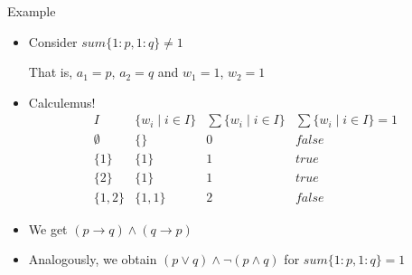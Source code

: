 \begin{frame}{Example}
  \begin{itemize}
  \item Consider $\mathit{sum}\{ 1:p,1:q\}\neq 1$

    That is, $a_1=p$,  $a_2=q$ and  $w_1=1$,  $w_2=1$

  \item Calculemus!
    \[
    \begin{array}{c|c|c|c}
      I & \{ w_i \mid i \in I \} & \sum\{ w_i \mid i \in I \}   &  \sum\{ w_i \mid i \in I \} = 1\\
      \hline
      \emptyset&\{    \}&0&\mathit{false}\\
      \{1\}    &\{ 1  \}&1&\mathit{true}\\
      \{2\}    &\{   1\}&1&\mathit{true}\\
      \{1,2\}  &\{ 1,1\}&2&\mathit{false}
    \end{array}
    \]\pause
  \item We get
    \(
    (p\to q)\wedge (q\to p)
    \)
    \pause
  \item Analogously, we obtain
    \(
    (p\vee q)\wedge \neg (p\wedge q)
    \)
    for
    $\mathit{sum}\{ 1:p,1:q\}=1$
  \end{itemize}
\end{frame}
